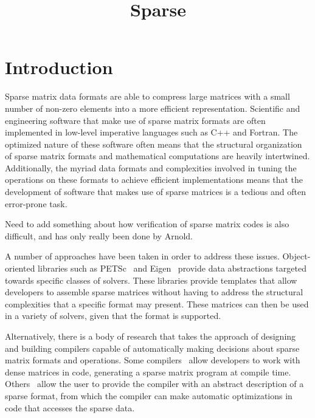 \documentclass[11pt,conference]{IEEEtran}
\begin{document}
\title{Sparse}
\author{
  \and
}

\maketitle

\section{Introduction}

Sparse matrix data formats are able to compress large matrices with a small number of non-zero elements into a more efficient representation.  
Scientific and engineering software that make use of sparse matrix formats are often implemented in low-level imperative languages such as C++ and Fortran.  The optimized nature of these software often means that the structural organization of sparse matrix formats and mathematical computations are heavily intertwined.  Additionally, the myriad data formats and complexities involved in tuning the operations on these formats to achieve efficient implementations means that the development of software that makes use of sparse matrices is a tedious and often error-prone task.

Need to add something about how verification of sparse matrix codes is also difficult, and has only really been done by Arnold. 

A number of approaches have been taken in order to address these issues.  Object-oriented libraries such as PETSc~\cite{petsc2019} and Eigen~\cite{eigenweb2010} provide data abstractions targeted towards specific classes of solvers.  These libraries provide templates that allow developers to assemble sparse matrices without having to address the structural complexities that a specific format may present.  These matrices can then be used in a variety of solvers, given that the format is supported.

Alternatively, there is a body of research that takes the approach of designing and building compilers capable of automatically making decisions about sparse matrix formats and operations.  Some compilers~\cite{bik1995, bik1996} allow developers to work with dense matrices in code, generating a sparse matrix program at compile time.  Others~\cite{kotlyar1997} allow the user to provide the compiler with an abstract description of a sparse format, from which the compiler can make automatic optimizations in code that accesses the sparse data.
\end{document}
